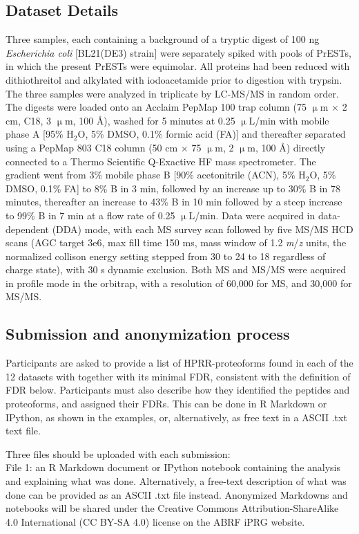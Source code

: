 \documentclass[a4paper,12pt]{article}
\begin{document}
\subsection*{Dataset Details}
Three samples, each containing a background of a tryptic digest of 100 ng \textit{Escherichia coli} [BL21(DE3) strain] were separately spiked with pools of PrESTs, in which the present PrESTs were equimolar. All proteins had been reduced with dithiothreitol and alkylated with iodoacetamide prior to digestion with trypsin. The three samples were analyzed in triplicate by LC-MS/MS in random order. The digests were loaded onto an Acclaim PepMap 100 trap column (75 $\upmu$m $\times$ 2 cm, C18, 3 $\upmu$m, 100 \AA), washed for 5 minutes at 0.25 $\upmu$L/min with mobile phase A [95\% H$_2$O, 5\% DMSO, 0.1\% formic acid (FA)] and thereafter separated using a PepMap 803 C18 column (50 cm $\times$ 75 $\upmu$m, 2 $\upmu$m, 100 \AA) directly connected to a Thermo Scientific Q-Exactive HF mass spectrometer. The gradient went from 3\% mobile phase B [90\% acetonitrile (ACN), 5\% H$_2$O, 5\% DMSO, 0.1\% FA] to 8\% B in 3 min, followed by an increase up to 30\% B in 78 minutes, thereafter an increase to 43\% B in 10 min followed by a steep increase to 99\% B in 7 min at a flow rate of 0.25 $\upmu$L/min. Data were acquired in data-dependent (DDA) mode, with each MS survey scan followed by five MS/MS HCD scans (AGC target 3e6, max fill time 150 ms, mass window of 1.2 \textit{m}/\textit{z} units, the normalized collison energy setting stepped from 30 to 24 to 18 regardless of charge state), with 30 s dynamic exclusion. Both MS and MS/MS were acquired in profile mode in the orbitrap, with a resolution of 60,000 for MS, and 30,000 for MS/MS.

\subsection*{Submission and anonymization process}
Participants are asked to provide a list of HPRR-proteoforms found in each
of the 12 datasets with together with its minimal FDR, consistent with the definition of FDR below. Participants must also describe how they identified the peptides and proteoforms, and assigned their FDRs. This can be done in R Markdown or IPython, as shown in the examples, or, alternatively, as free text in a ASCII .txt text file.

Three files should be uploaded with each submission:\\

File 1: an R Markdown document or IPython notebook containing the analysis and explaining what was done. Alternatively, a free-text description of what was done can be provided as an ASCII .txt file instead. Anonymized Markdowns and notebooks will be shared under the Creative Commons Attribution-ShareAlike 4.0 International (CC BY-SA 4.0) license on the ABRF iPRG website.\\
\end{document}

